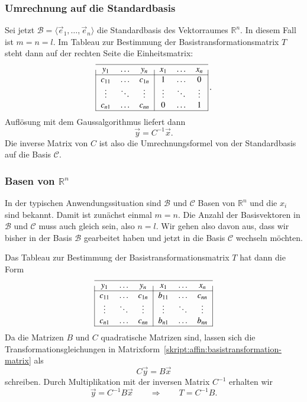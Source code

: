 \subsubsection{Umrechnung auf die Standardbasis}
Sei jetzt $\mathcal{B}=\langle\vec{e}_1,\dots,\vec{e}_n\rangle$ die
Standardbasis des Vektorraumes $\mathbb R^n$.
In diesem Fall ist $m=n=l$.
Im Tableau zur Bestimmung der Basistransformationsmatrix $T$ steht dann
auf der rechten Seite die Einheitsmatrix:
\begin{equation*}
\begin{tabular}{|>{$}c<{$}>{$}c<{$}>{$}c<{$}|>{$}c<{$}>{$}c<{$}>{$}c<{$}|}
\hline
   y_1&\dots &   y_n&   x_1&\dots &   x_n\\
\hline
c_{11}&\dots &c_{1n}&  1   &\dots &  0   \\
\vdots&\ddots&\vdots&\vdots&\ddots&\vdots\\
c_{n1}&\dots &c_{nn}&  0   &\dots &  1   \\
\hline
\end{tabular}\,.
\end{equation*}
Auflösung mit dem Gaussalgorithmus liefert dann
\[
\vec{y} = C^{-1} \vec{x}.
\]
Die inverse Matrix von $C$ ist also die Umrechnungsformel von der
Standardbasis auf die Basis $\mathcal{C}$.

\subsubsection{Basen von $\mathbb{R}^n$}
In der typischen Anwendungssituation sind $\mathcal{B}$ und $\mathcal{C}$
Basen von $\mathbb{R}^n$ und die $x_i$ sind bekannt.
Damit ist zunächst einmal $m=n$.
Die Anzahl der Basisvektoren in $\mathcal{B}$ und $\mathcal{C}$ muss
auch gleich sein, also $n=l$.
Wir gehen also davon aus, dass wir bisher in
der Basis $\mathcal{B}$ gearbeitet haben und jetzt in die Basis
$\mathcal{C}$ wechseln möchten.

Das Tableau zur Bestimmung der Basistransformationsmatrix $T$ hat dann die
Form
\begin{equation*}
\begin{tabular}{|>{$}c<{$}>{$}c<{$}>{$}c<{$}|>{$}c<{$}>{$}c<{$}>{$}c<{$}|}
\hline
   y_1&\dots &   y_n&   x_1&\dots &   x_n\\
\hline
c_{11}&\dots &c_{1n}&b_{11}&\dots &c_{nn}\\
\vdots&\ddots&\vdots&\vdots&\ddots&\vdots\\
c_{n1}&\dots &c_{nn}&b_{n1}&\dots &b_{nn}\\
\hline
\end{tabular}
\end{equation*}
Da die Matrizen $B$ und $C$ quadratische Matrizen sind, lassen sich die
Transformationsgleichungen in
Matrixform~\eqref{skript:affin:basistransformation-matrix}
als
\[
C\vec{y} = B\vec{x}
\]
schreiben.
Durch Multiplikation mit der inversen Matrix $C^{-1}$ erhalten wir
\begin{equation}
\vec{y} = C^{-1}B\vec{x}
\qquad\Rightarrow\qquad
T=C^{-1}B.
\label{skript:affin:basiswechselt}
\end{equation}

